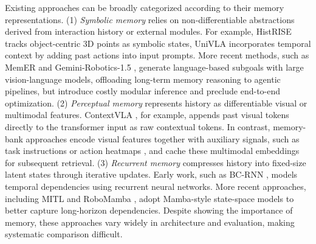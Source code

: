 Existing approaches can be broadly categorized according to their memory representations.
(1) \textit{Symbolic memory} relies on non-differentiable abstractions derived from interaction history or external modules. For example, HistRISE \cite{chen2025history} tracks object-centric 3D points as symbolic states,
UniVLA \cite{bu2025learning} incorporates temporal context by
adding past actions into input prompts.
More recent methods, such as MemER \cite{sridhar2025memer} and Gemini-Robotics-1.5 \cite{team2025geminirobot}, generate language-based subgoals with large vision-language models, offloading long-term memory reasoning to agentic pipelines, but introduce costly modular inference and preclude end-to-end optimization.
(2) \textit{Perceptual memory} represents history as differentiable visual or multimodal features. ContextVLA \cite{jang2025contextvla}, for example, appends past visual tokens directly to the transformer input as raw contextual tokens. In contrast, memory-bank approaches encode visual features together with auxiliary signals, such as task instructions \cite{shi2025memoryvla, koo2025hamlet} or action heatmaps \cite{fang2025sam2act}, and cache these multimodal embeddings for subsequent retrieval.
(3) \textit{Recurrent memory} compresses history into fixed-size latent states through iterative updates. Early work, such as BC-RNN \cite{mandlekar2021matters}, models temporal dependencies using recurrent neural networks. More recent approaches, including MITL \cite{zhou2025mtil} and RoboMamba \cite{liu2024robomamba}, adopt Mamba-style state-space models \cite{gu2024mamba} to better capture long-horizon dependencies.
Despite showing the importance of memory, these approaches vary widely in architecture and evaluation, making systematic comparison difficult.
